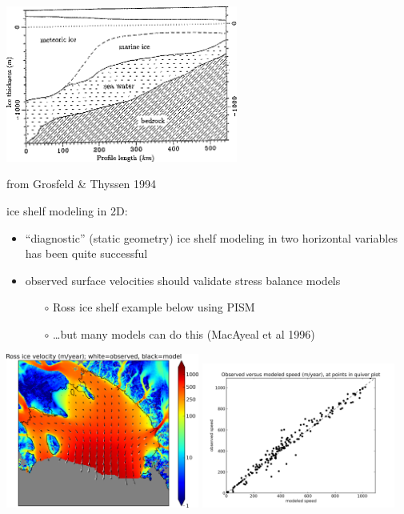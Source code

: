 \documentclass[titlepage,letterpaper,final,11pt]{scrartcl}
\begin{document}
\medskip
\begin{center}
  \includegraphics[width=3.0in]{marineice}
  
from Grosfeld \& Thyssen 1994 \nocite{GrosfeldThyssen1994}
\end{center}

ice shelf modeling in 2D:

\begin{itemize}
\item ``diagnostic'' (static geometry) ice shelf modeling in two horizontal variables has been quite successful
\item observed surface velocities should validate stress balance models
  \begin{itemize}
  \item[$\circ$] Ross ice shelf example below using PISM
  \item[$\circ$] \dots but many models can do this (MacAyeal et al 1996\nocite{MacAyealetal})
  \end{itemize}
\end{itemize}

\begin{center}
  \includegraphics[width=2.5in]{rossquiver}
  \quad
  \includegraphics[width=2.5in]{rossscatter}
\end{center}
\end{document}
